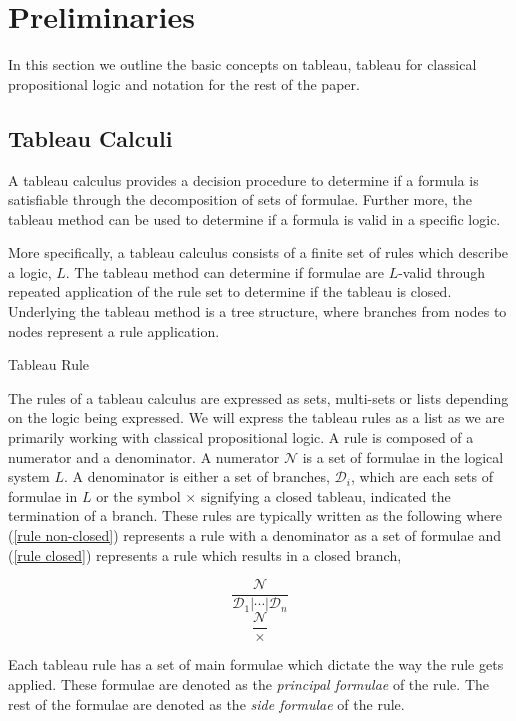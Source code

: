 \documentclass{llncs}
\begin{document}
\section{Preliminaries}

In this section we outline the basic concepts on tableau, tableau for classical
propositional logic and notation for the rest of the paper.

\subsection{Tableau Calculi}

A tableau calculus provides a decision procedure to determine if a formula
is satisfiable through the decomposition of sets of formulae. Further more,
the tableau method can be used to determine if a formula is valid in a specific
logic.

More specifically, a tableau calculus consists of a finite set of rules which
describe a logic, $L$. The tableau method can determine if formulae
are $L$-valid through repeated application of the rule set to
determine if the tableau is closed. Underlying the tableau method is a tree
structure, where branches from nodes to nodes represent a rule application.

\begin{definition}{Tableau Rule}\label{Tableau Rule}

The rules of a tableau calculus are expressed as sets, multi-sets or lists
depending on the logic being expressed. We will express the tableau rules as a
list as we are primarily working with classical propositional logic. A rule is
composed of a numerator and a denominator. A numerator $\mathcal{N}$ is a set
of formulae in the logical system $L$. A denominator is either a set of
branches, $\mathcal{D}_i$, which are each sets of formulae in $L$ or the symbol
$\times$ signifying a closed tableau, indicated the termination of a branch.
These rules are typically written as the following where (\ref{rule
non-closed}) represents a rule with a denominator as a set of formulae and
(\ref{rule closed}) represents a rule which results in a closed branch,

\begin{multicols}{2}
\noindent
\begin{equation}
\frac{\mathcal{N}}{\mathcal{D}_1 \vert \cdots \vert \mathcal{D}_n}
\label{rule non-closed}
\end{equation}
\begin{equation}
\frac{\mathcal{N}}{\times}
\label{rule closed}
\end{equation}
\end{multicols}

Each tableau rule has a set of main formulae which dictate the way the rule
gets applied. These formulae are denoted as the \textit{principal formulae} of
the rule. The rest of the formulae are denoted as the \textit{side formulae} of
the rule.
\end{definition}
\end{document}
